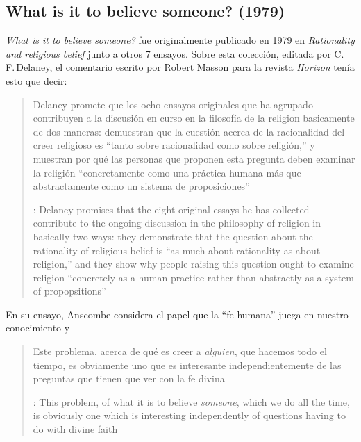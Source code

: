\subsection{What is it to believe someone? (1979)}

\emph{What is it to believe someone?} fue originalmente publicado en 1979 en \emph{Rationality and religious belief} junto a otros 7 ensayos. Sobre esta colección, editada por C.\,F.\,Delaney, el comentario escrito por Robert Masson para la revista \emph{Horizon} tenía esto que decir: \blockquote[{\cite[440]{masson1981}}: Delaney promises that the eight original essays he has collected \textelp{} contribute to the ongoing discussion in the philosophy of religion in basically two ways: they demonstrate that the question about the rationality of religious belief is ``as much about rationality as about religion,'' and they show why people raising this question ought to examine religion ``concretely as a human practice rather than abstractly as a system of propopsitions'']{Delaney promete que los ocho ensayos originales que ha agrupado \textelp{} contribuyen a la discusión en curso en la filosofía de la religion basicamente de dos maneras: demuestran que la cuestión acerca de la racionalidad del creer religioso es ``tanto sobre racionalidad como sobre religión,'' y muestran por qué las personas que proponen esta pregunta deben examinar la religión ``concretamente como una práctica humana más que abstractamente como un sistema de proposiciones''}. En su ensayo, Anscombe considera el papel que la \enquote{fe humana} juega en nuestro conocimiento y \blockquote[{\cite[xvii]{anscombe2008faith}}: This problem, of what it is to believe \emph{someone}, which we do all the time, is obviously one which is interesting independently of questions having to do with divine faith]{Este problema, acerca de qué es creer a \emph{alguien}, que hacemos todo el tiempo, es obviamente uno que es interesante independientemente de las preguntas que tienen que ver con la fe divina}.

